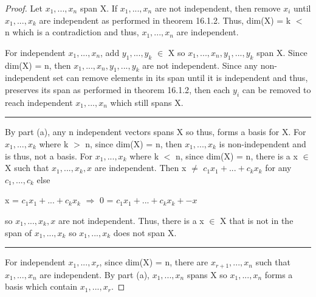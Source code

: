     \begin{proof}
        Let $x_1,...,x_n$ span X. If $x_1,...,x_n$ are not independent,
        then remove $x_i$ until $x_1,...,x_k$ are independent
        as performed in {\color{red} theorem 16.1.2}.
        Thus, dim(X) = k $<$ n which is a contradiction and thus,
        $x_1,...,x_n$ are independent.

        For independent $x_1,...,x_n$, add $y_1,...,y_k$ $\in$ X
        so $x_1,...,x_n,y_1,...,y_k$ span X.
        Since dim(X) = n, then $x_1,...,x_n,y_1,...,y_k$ are not independent.
        Since any non-independent set can remove elements in its span until it is
        independent and thus, preserves its span as performed in
        {\color{red} theorem 16.1.2}, then each $y_i$ can be removed to reach
        independent $x_1,...,x_n$ which still spans X.

        \rule[0.1cm]{15.3cm}{0.01cm}

        By part (a), any n independent vectors spans X so thus, forms a basis
        for X.
        For $x_1,...,x_k$ where k $>$ n, since dim(X) = n, then
        $x_1,...,x_k$ is non-independent and is thus, not a basis.
        For $x_1,...,x_k$ where k $<$ n, since dim(X) = n, there is a x $\in$ X
        such that $x_1,...,x_k,x$ are independent.
        Then x $\not =$ $c_1x_1 + ... + c_kx_k$ for any $c_1,...,c_k$ else
        
        \hspace{0.5cm}
        x = $c_1x_1 + ... + c_kx_k$
        \hspace{0.7cm}
        $\Rightarrow$
        \hspace{0.7cm}
        0 = $c_1x_1 + ... + c_kx_k + -x$

        so $x_1,...,x_k,x$ are not independent.
        Thus, there is a x $\in$ X that is not in the span of $x_1,...,x_k$
        so $x_1,...,x_k$ does not span X.

        \rule[0.1cm]{15.3cm}{0.01cm}

        For independent $x_1,...,x_r$, since dim(X) = n, there are
        $x_{r+1},...,x_n$ such that $x_1,...,x_n$ are independent.
        By part (a), $x_1,...,x_n$ spans X so $x_1,...,x_n$ forms a basis
        which contain $x_1,...,x_r$.
    \end{proof}
    
    \newpage



